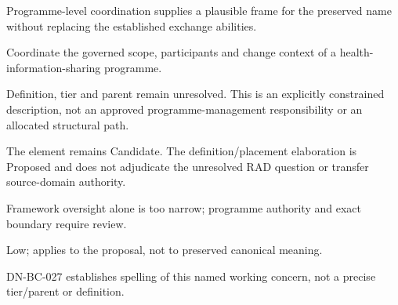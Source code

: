 Programme-level coordination supplies a plausible frame for the preserved name without replacing the established exchange abilities.



Coordinate the governed scope, participants and change context of a health-information-sharing programme.



Definition, tier and parent remain unresolved. This is an explicitly constrained description, not an approved programme-management responsibility or an allocated structural path.



The element remains Candidate. The definition/\allowbreak{}placement elaboration is Proposed and does not adjudicate the unresolved RAD question or transfer source-domain authority.



Framework oversight alone is too narrow; programme authority and exact boundary require review.


Low; applies to the proposal, not to preserved canonical meaning.

DN-BC-027 establishes spelling of this named working concern, not a precise tier/\allowbreak{}parent or definition.


